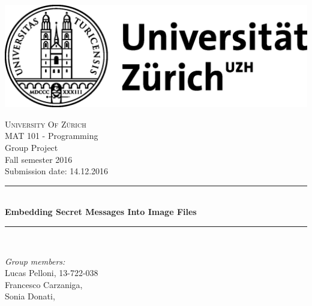 \documentclass[
parskip=full,               %
12pt,                       %
twoside,                    %
a4paper                     %
]{article}
\begin{document}
	
	\begin{titlepage}

\newcommand{\HRule}{\rule{\linewidth}{0.5mm}} %

\center %
 
\begin{center}
\includegraphics[scale = 1]{./uzhlogo}
\end{center} 
\textsc{\LARGE University Of Zürich}\\[1.5cm] %
\Large MAT 101 - Programming\\
\Large Group Project\\
\Large Fall semester 2016 \\[0.5cm]
\large Submission date: 14.12.2016 \\[0.5cm] %


\HRule \\[0.4cm]
{ \huge \bfseries Embedding Secret Messages Into Image Files }\\[0.4cm] %
\HRule \\[1.5cm]
 

\begin{minipage}{0.4\textwidth}
\centering
\emph{Group members:}\\ 
Lucas Pelloni, 13-722-038\\
Francesco Carzaniga,  \\
Sonia Donati,  \\
\end{minipage}



\end{titlepage}
\end{document}
